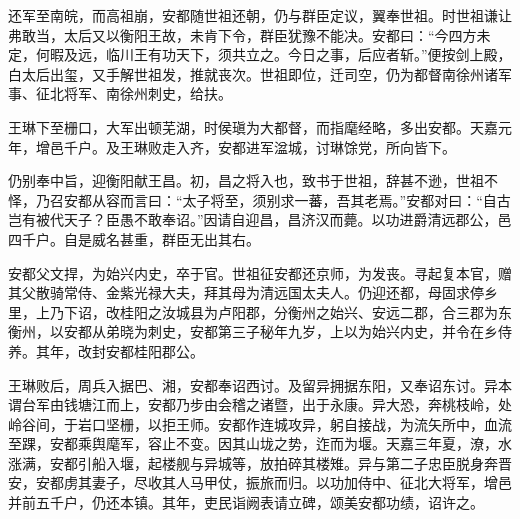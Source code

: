 \documentclass[]{article}
\begin{document}
还军至南皖，而高祖崩，安都随世祖还朝，仍与群臣定议，翼奉世祖。时世祖谦让弗敢当，太后又以衡阳王故，未肯下令，群臣犹豫不能决。安都曰：``今四方未定，何暇及远，临川王有功天下，须共立之。今日之事，后应者斩。''便按剑上殿，白太后出玺，又手解世祖发，推就丧次。世祖即位，迁司空，仍为都督南徐州诸军事、征北将军、南徐州刺史，给扶。

王琳下至栅口，大军出顿芜湖，时侯瑱为大都督，而指麾经略，多出安都。天嘉元年，增邑千户。及王琳败走入齐，安都进军湓城，讨琳馀党，所向皆下。

仍别奉中旨，迎衡阳献王昌。初，昌之将入也，致书于世祖，辞甚不逊，世祖不怿，乃召安都从容而言曰：``太子将至，须别求一蕃，吾其老焉。''安都对曰：``自古岂有被代天子？臣愚不敢奉诏。''因请自迎昌，昌济汉而薨。以功进爵清远郡公，邑四千户。自是威名甚重，群臣无出其右。

安都父文捍，为始兴内史，卒于官。世祖征安都还京师，为发丧。寻起复本官，赠其父散骑常侍、金紫光禄大夫，拜其母为清远国太夫人。仍迎还都，母固求停乡里，上乃下诏，改桂阳之汝城县为卢阳郡，分衡州之始兴、安远二郡，合三郡为东衡州，以安都从弟晓为刺史，安都第三子秘年九岁，上以为始兴内史，并令在乡侍养。其年，改封安都桂阳郡公。

王琳败后，周兵入据巴、湘，安都奉诏西讨。及留异拥据东阳，又奉诏东讨。异本谓台军由钱塘江而上，安都乃步由会稽之诸暨，出于永康。异大恐，奔桃枝岭，处岭谷间，于岩口坚栅，以拒王师。安都作连城攻异，躬自接战，为流矢所中，血流至踝，安都乘舆麾军，容止不变。因其山垅之势，迮而为堰。天嘉三年夏，潦，水涨满，安都引船入堰，起楼舰与异城等，放拍碎其楼雉。异与第二子忠臣脱身奔晋安，安都虏其妻子，尽收其人马甲仗，振旅而归。以功加侍中、征北大将军，增邑并前五千户，仍还本镇。其年，吏民诣阙表请立碑，颂美安都功绩，诏许之。
\end{document}

